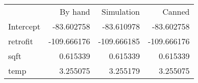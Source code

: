\begin{tabular}{lrrr}
 & By hand & Simulation & Canned \\
Intercept & -83.602758 & -83.610978 & -83.602758 \\
retrofit & -109.666176 & -109.666185 & -109.666176 \\
sqft & 0.615339 & 0.615339 & 0.615339 \\
temp & 3.255075 & 3.255179 & 3.255075 \\
\end{tabular}
